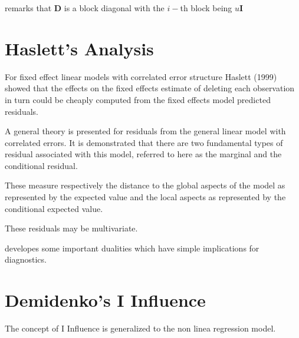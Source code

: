 \documentclass[12pt, a4paper]{article}
\begin{document}
\citet{zewotir} remarks that $\boldsymbol{D}$ is a block diagonal with the $i-$th block being $u \boldsymbol{I}$

\newpage
\section{Haslett's Analysis} %
For fixed effect linear models with correlated error structure Haslett (1999) showed that the effects on
the fixed effects estimate of deleting each observation in turn could be cheaply computed from the fixed effects model predicted residuals.


A general theory is presented for residuals from the general linear model with correlated errors.
It is demonstrated that there are two fundamental types of residual associated with this model,
referred to here as the marginal and the conditional residual.


These measure respectively the distance to the global aspects of the model as represented by the expected value
and the local aspects as represented by the conditional expected value.


These residuals may be multivariate.


\citet{HaslettHayes} developes some important dualities which have simple implications for diagnostics.





\section{Demidenko's I Influence} %
The concept of I Influence is generalized  to the non linea regression model.




\end{document}
